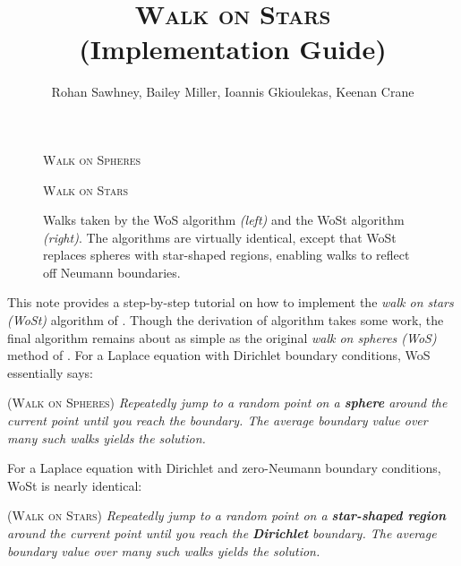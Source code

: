 \documentclass{article}
\title{\textsc{Walk on Stars} \\ \Large{(Implementation Guide)}}
\author{Rohan Sawhney, Bailey Miller, Ioannis Gkioulekas, Keenan Crane}
\date{}
\newcommand{\figlabel}[1]{\textsf{#1}}
\newcommand{\todo}[1]{\textbf{\hl{TODO: #1}}}
\begin{document}
\maketitle

\begin{figure}[h!]
   \centering
   \begin{minipage}{150pt}
      \centering
      \figlabel{\phantom{mmmm}\textsc{Walk on Spheres}} \\
      
   \end{minipage}
   \begin{minipage}{250pt}
      \centering
      \figlabel{\textsc{Walk on Stars}\phantom{mmmmm}} \\
      
   \end{minipage}
   \caption{Walks taken by the WoS algorithm \emph{(left)} and the WoSt algorithm \emph{(right)}.  The algorithms are virtually identical, except that WoSt replaces spheres with star-shaped regions, enabling walks to reflect off Neumann boundaries.\label{fig:WoSvsWoSt}}
\end{figure}


This note provides a step-by-step tutorial on how to implement the \emph{walk on stars (WoSt)} algorithm of \citet{Sawhney:2023:WoSt}.  Though the derivation of algorithm takes some work, the final algorithm remains about as simple as the original \emph{walk on spheres (WoS)} method of \citet{muller1956some}.  For a Laplace equation with Dirichlet boundary conditions, WoS essentially says:

\begin{mdframed}[backgroundcolor=black!10,rightline=false,leftline=false]
   \textsc{(Walk on Spheres)} \emph{Repeatedly jump to a random point on a \textbf{sphere} around the current point until you reach the boundary.  The average boundary value over many such walks yields the solution.}
\end{mdframed}

For a Laplace equation with Dirichlet and zero-Neumann boundary conditions, WoSt is nearly identical:

\begin{mdframed}[backgroundcolor=black!10,rightline=false,leftline=false]
   \textsc{(Walk on Stars)} \emph{Repeatedly jump to a random point on a \textbf{star-shaped region} around the current point until you reach the \textbf{Dirichlet} boundary.  The average boundary value over many such walks yields the solution.}
\end{mdframed}
\end{document}
